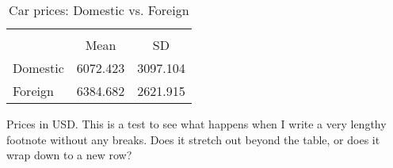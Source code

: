\begin{table}[htbp]\centering
\begin{threeparttable}
\caption{Car prices: Domestic vs. Foreign}
\def\sym#1{\ifmmode^{#1}\else\(^{#1}\)\fi}
\begin{tabular} {l*{1}{cc}}
\toprule 
&\multicolumn{2}{c}{}          \\
& Mean & SD                            \\
\midrule
Domestic &  6072.423 &  3097.104\\
Foreign &  6384.682 &  2621.915\\
\bottomrule
\end{tabular}
\begin{tablenotes}[flushleft]
\item \footnotesize{Prices in USD. This is a test to see what happens when I write a very lengthy footnote without any breaks. Does it stretch out beyond the table, or does it wrap down to a new row?}
\end{tablenotes}
\end{threeparttable}
\end{table}